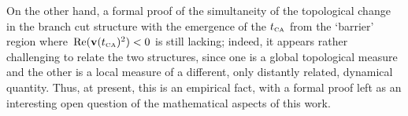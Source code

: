 On the other hand, a formal proof of the simultaneity of the topological change in the branch cut structure with the emergence of the ${t_{\scriptscriptstyle\mathrm{CA}}}$ from the `barrier' region where~$\Re(\vb{v}({t_{\scriptscriptstyle\mathrm{CA}}})^2)<0$ is still lacking; indeed, it appears rather challenging to relate the two structures, since one is a global topological measure and the other is a local measure of a different, only distantly related, dynamical quantity. Thus, at present, this is an empirical fact, with a formal proof left as an interesting open question of the mathematical aspects of this work.









\captionsetup[figure]{position=top}

